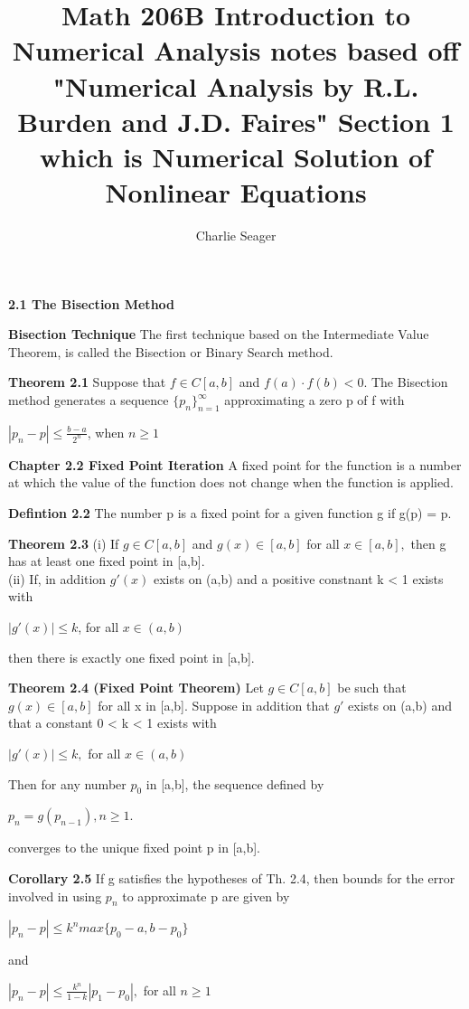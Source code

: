 \documentclass{article}
\begin{document}
\title{Math 206B Introduction to Numerical Analysis notes based off "Numerical Analysis by R.L. Burden and J.D. Faires" Section 1 which is Numerical Solution of Nonlinear Equations}
\author{Charlie Seager}
\maketitle

\textbf{2.1 The Bisection Method}

\textbf {Bisection Technique} The first technique based on the Intermediate Value Theorem, is called the Bisection or Binary Search method.

\textbf {Theorem 2.1} Suppose that $f \in C[a,b]$ and $f(a) \cdot f(b) < 0$. The Bisection method generates a sequence ${\{p_n\}_{n=1}^{\infty}}$ approximating a zero p of f with

\begin{center}
$| p_n - p| \leq \frac{b-a}{2^n}$, when $n \geq 1$
\end{center}

\textbf{Chapter 2.2 Fixed Point Iteration} A fixed point for the function is a number at which the value of the function does not change when the function is applied.

\textbf{Defintion 2.2} The number p is a fixed point for a given function g if g(p) = p.

\textbf{Theorem 2.3} (i) If $g \in C[a,b]$ and $g(x) \in [a,b]$ for all $x \in [a,b],$ then g has at least one fixed point in [a,b].
\\ (ii) If, in addition $g'(x)$ exists on (a,b) and a positive constnant k < 1 exists with 
\begin{center}
$|g'(x)| \leq k$, for all $x \in (a,b)$
\end{center}
then there is exactly one fixed point in [a,b].

\textbf {Theorem 2.4 (Fixed Point Theorem)} Let $g \in C[a,b]$ be such that $g(x) \in [a,b]$ for all x in [a,b]. Suppose in addition that $g'$ exists on (a,b) and that a constant 0 < k < 1 exists with
\begin{center}
$|g'(x)| \leq k, $ for all $x \in (a,b)$
\end{center}
Then for any number $p_0$ in [a,b], the sequence defined by
\begin{center}
$p_n = g(p_{n-1}), n \geq 1.$
\end{center}
converges to the unique fixed point p in [a,b].

\textbf {Corollary 2.5} If g satisfies the hypotheses of Th. 2.4, then bounds for the error involved in using $p_n$ to approximate p are given by
\begin{center}
$|p_n - p| \leq k^n max \{p_0 - a,b - p_0\}$
\end{center}
and
\begin{center}
$|p_n - p| \leq \frac{k^n}{1-k} |p_1 - p_0|,$ for all $n \geq 1$
\end{center}
\end{document}
